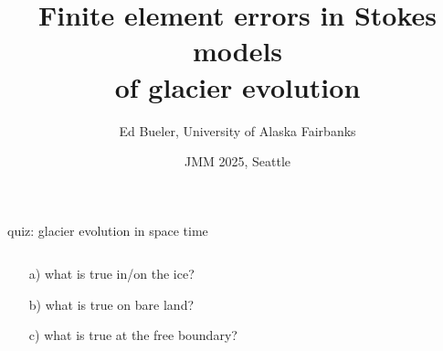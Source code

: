\documentclass[10pt,dvipsnames]{beamer}
\title{Finite element errors in Stokes models \\ of glacier evolution}
\date{JMM 2025, Seattle}
\author{Ed Bueler, University of Alaska Fairbanks}
\begin{document}
\graphicspath{{figs/}{../NWG24/figs/}}

\maketitle

\begin{frame}{quiz: glacier evolution in space time}

\bigskip \bigskip

\begin{columns}
\begin{column}{0.26\textwidth}
\begin{itemize}
\item[a)] what is true in/on the ice?
\item[b)] what is true on bare land?
\item[c)] what is true at the free boundary?
\end{itemize}\end{column}
\begin{column}{0.74\textwidth}
\end{column}
\end{columns}
\end{frame}
\end{document}
